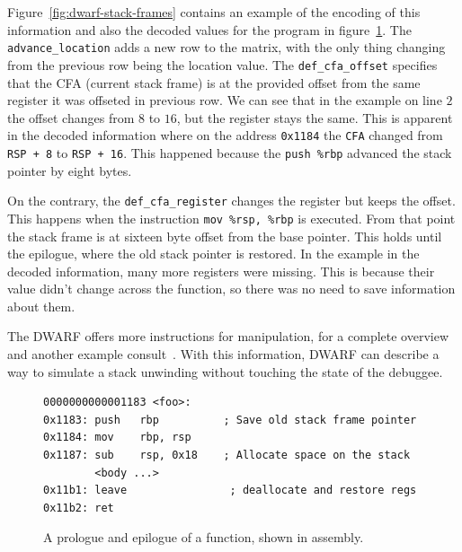 Figure~\ref{fig:dwarf-stack-frames} contains an example of the encoding of this
information and also the decoded values for the program in
figure~\ref{fig:prologue-and-epilogue}. The \texttt{advance\_location} adds a
new row to the matrix, with the only thing changing from the previous row being
the location value. The \texttt{def\_cfa\_offset} specifies that the CFA
(current stack frame) is at the provided offset from the same register it was
offseted in previous row. We can see that in the example on line $2$ the offset
changes from $8$ to $16$, but the register stays the same. This is apparent in
the decoded information where on the address \texttt{0x1184} the \texttt{CFA}
changed from \texttt{RSP + 8} to \texttt{RSP + 16}. This happened because the
\texttt{push \%rbp} advanced the stack pointer by eight bytes.

On the contrary, the \verb|def_cfa_register| changes the register but keeps
the offset. This happens when the instruction \texttt{mov \%rsp, \%rbp} is
executed. From that point the stack frame is at sixteen byte offset from the
base pointer. This holds until the epilogue, where the old stack pointer is
restored. In the example in the decoded information, many more registers were
missing. This is because their value didn't change across the function, so
there was no need to save information about them.

The DWARF offers more instructions for manipulation, for a complete overview
and another example consult~\cite{dwarf}. With this information, DWARF can
describe a way to simulate a stack unwinding without touching the state of the
debuggee.

\begin{figure}
    \begin{lstlisting}
0000000000001183 <foo>:
0x1183:	push   rbp          ; Save old stack frame pointer
0x1184:	mov    rbp, rsp     
0x1187:	sub    rsp, 0x18    ; Allocate space on the stack
        <body ...>
0x11b1:	leave                ; deallocate and restore regs
0x11b2:	ret
    \end{lstlisting}
    \caption{A prologue and epilogue of a function, shown in assembly.}
    \label{fig:prologue-and-epilogue}
\end{figure}

